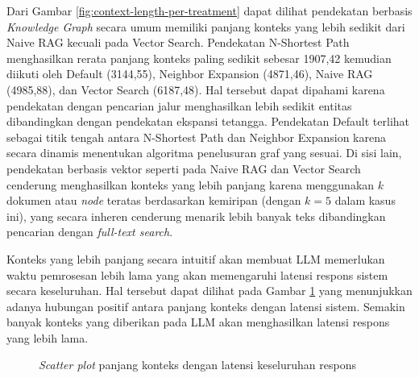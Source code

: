Dari Gambar \ref{fig:context-length-per-treatment} dapat dilihat pendekatan berbasis \textit{Knowledge Graph} secara umum memiliki panjang konteks yang lebih sedikit dari Naive RAG kecuali pada Vector Search.
Pendekatan N-Shortest Path menghasilkan rerata panjang konteks paling sedikit sebesar 1907,42 kemudian diikuti oleh Default (3144,55), Neighbor Expansion (4871,46), Naive RAG (4985,88), dan Vector Search (6187,48).
Hal tersebut dapat dipahami karena pendekatan dengan pencarian jalur menghasilkan lebih sedikit entitas dibandingkan dengan pendekatan ekspansi tetangga.
Pendekatan Default terlihat sebagai titik tengah antara N-Shortest Path dan Neighbor Expansion karena secara dinamis menentukan algoritma penelusuran graf yang sesuai.
Di sisi lain, pendekatan berbasis vektor seperti pada Naive RAG dan Vector Search cenderung menghasilkan konteks yang lebih panjang karena menggunakan $k$ dokumen atau \textit{node} teratas berdasarkan kemiripan (dengan $k=5$ dalam kasus ini), yang secara inheren cenderung menarik lebih banyak teks dibandingkan pencarian dengan \textit{full-text search}.

Konteks yang lebih panjang secara intuitif akan membuat LLM memerlukan waktu pemrosesan lebih lama yang akan memengaruhi latensi respons sistem secara keseluruhan.
Hal tersebut dapat dilihat pada Gambar \ref{fig:context-length-vs-latency} yang menunjukkan adanya hubungan positif antara panjang konteks dengan latensi sistem.
Semakin banyak konteks yang diberikan pada LLM akan menghasilkan latensi respons yang lebih lama.

\begin{figure}[H]
	\centering
	\caption{\textit{Scatter plot} panjang konteks dengan latensi keseluruhan respons}
	\label{fig:context-length-vs-latency}
\end{figure}

